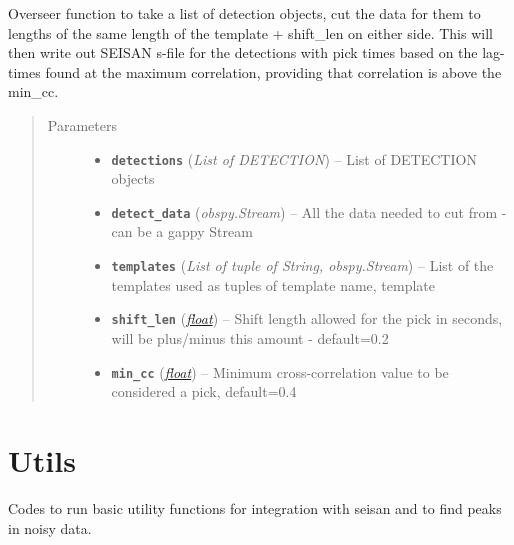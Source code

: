 \documentclass[a4paper,10pt,english]{sphinxmanual}
\begin{document}
\begin{fulllineitems}
\label{core:lag_calc.lag_calc}
Overseer function to take a list of detection objects, cut the data for
them to lengths of the same length of the template + shift\_len on
either side. This will then write out SEISAN s-file for the detections
with pick times based on the lag-times found at the maximum correlation,
providing that correlation is above the min\_cc.
\begin{quote}\begin{description}
\item[{Parameters}] \leavevmode\begin{itemize}
\item {} 
\textbf{\texttt{detections}} (\emph{List of DETECTION}) -- List of DETECTION objects

\item {} 
\textbf{\texttt{detect\_data}} (\emph{obspy.Stream}) -- All the data needed to cut from - can be a gappy Stream

\item {} 
\textbf{\texttt{templates}} (\emph{List of tuple of String, obspy.Stream}) -- List of the templates used as tuples of template name, template

\item {} 
\textbf{\texttt{shift\_len}} (\href{https://docs.python.org/library/functions.html\#float}{\emph{float}}) -- Shift length allowed for the pick in seconds, will be
plus/minus this amount - default=0.2

\item {} 
\textbf{\texttt{min\_cc}} (\href{https://docs.python.org/library/functions.html\#float}{\emph{float}}) -- Minimum cross-correlation value to be considered a pick,
default=0.4

\end{itemize}

\end{description}\end{quote}

\end{fulllineitems}



\section{Utils}
\label{utils:utils}\label{utils::doc}
Codes to run basic utility functions for integration with seisan and to
find peaks in noisy data.
\end{document}

